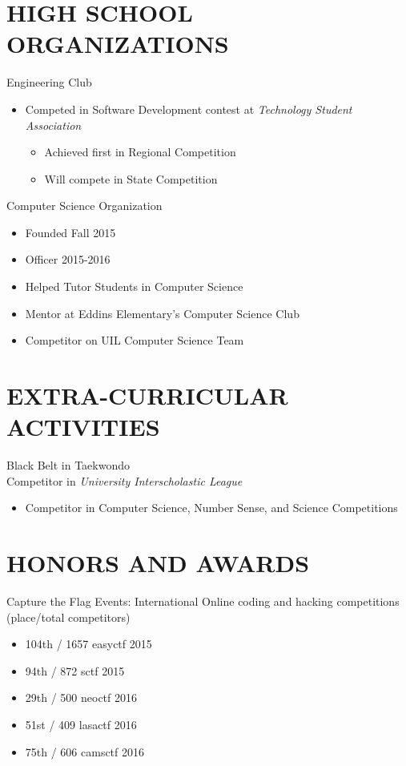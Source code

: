 \documentclass[margin]{res}
\begin{document}
\begin{resume}
\section{HIGH SCHOOL ORGANIZATIONS}
	Engineering Club
		\begin{itemize}
			\item
				Competed in Software Development contest at {\it Technology Student Association}
			\begin{itemize}
				\item 
					Achieved first in Regional Competition
				\item 
					Will compete in State Competition
			\end{itemize}
		\end{itemize}
	Computer Science Organization
		\begin{itemize}
			\item
				Founded \hfill Fall 2015
			\item
				Officer \hfill 2015-2016
			\item
				Helped Tutor Students in Computer Science
			\item
				Mentor at Eddins Elementary's Computer Science Club
			\item
				Competitor on UIL Computer Science Team
		\end{itemize}		

\section{EXTRA-CURRICULAR \\ ACTIVITIES}
	Black Belt in Taekwondo \\
	Competitor in {\it University Interscholastic League}
		\begin{itemize}
			\item
				Competitor in Computer Science, Number Sense, and Science Competitions
		\end{itemize}

\section{HONORS AND AWARDS}
	Capture the Flag Events: International Online coding and hacking competitions \\
	(place/total competitors)
	\begin{itemize}
		\item
			104th / 1657 easyctf \hfill 2015
		\item
			94th / 872 sctf \hfill 2015
		\item
			29th / 500 neoctf \hfill 2016
		\item
			51st / 409 lasactf \hfill 2016
		\item
			75th / 606 camsctf \hfill 2016
	\end{itemize}
	

\end{resume}
\end{document}
